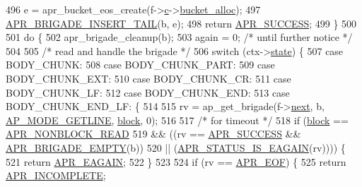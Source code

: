 \begin{DoxyCode}
{{{{496         e = apr\_bucket\_eos\_create(f->\hyperlink{structap__filter__t_afb039953f0c62d8455aa9f4bdd3ef487}{c}->\hyperlink{structconn__rec_a5a9ee4911c5a655131f76a04036fb4c0}{bucket\_alloc});
497         \hyperlink{group__APR__Util__Bucket__Brigades_ga5447595f8374296c5ffe208db39b2f5d}{APR\_BRIGADE\_INSERT\_TAIL}(b, e);
498         \textcolor{keywordflow}{return} \hyperlink{group__apr__errno_ga9ee311b7bf1c691dc521d721339ee2a6}{APR\_SUCCESS};
499     \}
500 
501     \textcolor{keywordflow}{do} \{
502         apr\_brigade\_cleanup(b);
503         again = 0; \textcolor{comment}{/* until further notice */}
504 
505         \textcolor{comment}{/* read and handle the brigade */}
506         \textcolor{keywordflow}{switch} (ctx->\hyperlink{structhttp__filter__ctx_a2e84a1c737dd4daa565b328c875402cb}{state}) \{
507         \textcolor{keywordflow}{case} BODY\_CHUNK:
508         \textcolor{keywordflow}{case} BODY\_CHUNK\_PART:
509         \textcolor{keywordflow}{case} BODY\_CHUNK\_EXT:
510         \textcolor{keywordflow}{case} BODY\_CHUNK\_CR:
511         \textcolor{keywordflow}{case} BODY\_CHUNK\_LF:
512         \textcolor{keywordflow}{case} BODY\_CHUNK\_END:
513         \textcolor{keywordflow}{case} BODY\_CHUNK\_END\_LF: \{
514 
515             rv = ap\_get\_brigade(f->\hyperlink{structap__filter__t_af4835ed2c41734061dc374d92ba401a2}{next}, b, \hyperlink{util__filter_8h_ab570898d09fbbe5b6d838e28b90134e0ae223ad325ff670d0c1dd98d3c9dcad2d}{AP\_MODE\_GETLINE}, 
      \hyperlink{group__APACHE__CORE__FILTER_gafe0ebf200b97a61a45c0513334da9ab6}{block}, 0);
516 
517             \textcolor{comment}{/* for timeout */}
518             \textcolor{keywordflow}{if} (\hyperlink{group__APACHE__CORE__FILTER_gafe0ebf200b97a61a45c0513334da9ab6}{block} == \hyperlink{group__APR__Util__Bucket__Brigades_gga756973fb6392bd1026c3d96b4519776da42b97663ca71fbbf2e2af7c8192e5dd8}{APR\_NONBLOCK\_READ}
519                     && ((rv == \hyperlink{group__apr__errno_ga9ee311b7bf1c691dc521d721339ee2a6}{APR\_SUCCESS} && \hyperlink{group__APR__Util__Bucket__Brigades_ga836f61da6cce15074eff257ce4b6fc0f}{APR\_BRIGADE\_EMPTY}(b))
520                             || (\hyperlink{group__APR__STATUS__IS_ga9dd578bfcd76a2d997395608ae5b3a4e}{APR\_STATUS\_IS\_EAGAIN}(rv)))) \{
521                 \textcolor{keywordflow}{return} \hyperlink{group__APR__Error_ga0b2a5ebb819de5ce93d326939b586578}{APR\_EAGAIN};
522             \}
523 
524             \textcolor{keywordflow}{if} (rv == \hyperlink{group__APR__Error_ga35d9dca2514c522a2840aca0f3e2ebd3}{APR\_EOF}) \{
525                 \textcolor{keywordflow}{return} \hyperlink{group__APR__Error_ga64dff43b83bcefd3f3c751be6b864ca1}{APR\_INCOMPLETE};
}}}}
\end{DoxyCode}
